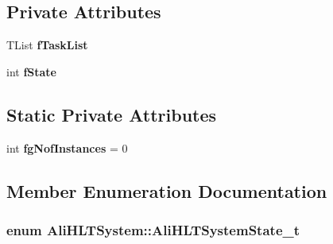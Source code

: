 \subsection*{Private Attributes}
\begin{CompactItemize}
\item 
TList {\bf f\-Task\-List}
\item 
int {\bf f\-State}
\end{CompactItemize}
\subsection*{Static Private Attributes}
\begin{CompactItemize}
\item 
int {\bf fg\-Nof\-Instances} = 0
\end{CompactItemize}


\subsection{Member Enumeration Documentation}
\subsubsection{\setlength{\rightskip}{0pt plus 5cm}enum {\bf Ali\-HLTSystem::Ali\-HLTSystem\-State\_\-t}}\label{classAliHLTSystem_w7}


